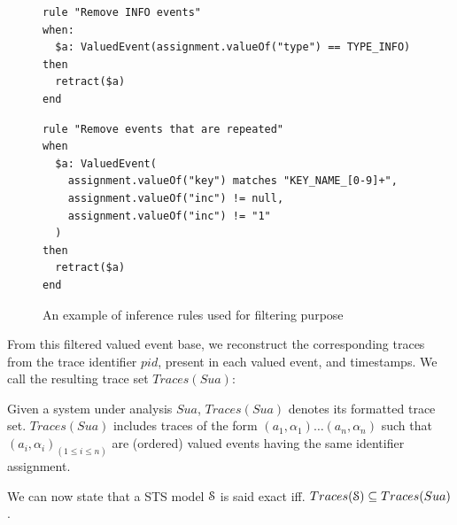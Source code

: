 \begin{figure}[ht]
\begin{framed}
\begin{BVerbatim}
rule "Remove INFO events"
when:
  $a: ValuedEvent(assignment.valueOf("type") == TYPE_INFO)
then
  retract($a)
end
\end{BVerbatim}
\end{framed}

\begin{framed}
\begin{BVerbatim}
rule "Remove events that are repeated"
when
  $a: ValuedEvent(
    assignment.valueOf("key") matches "KEY_NAME_[0-9]+",
    assignment.valueOf("inc") != null,
    assignment.valueOf("inc") != "1"
  )
then
  retract($a)
end
\end{BVerbatim}
\end{framed}

\caption{An example of inference rules used for filtering purpose}
\label{fig:removalrules}
\end{figure}

From this filtered valued event base, we reconstruct the
corresponding traces from the trace identifier $pid$, present in
each valued event, and timestamps. We call the resulting trace
set $Traces(Sua)$:

\begin{definition}
    Given a system under analysis $Sua$, $Traces(Sua)$ denotes
    its formatted trace set. $Traces(Sua)$ includes traces of the
    form $(a_1,\alpha_1) \dots (a_n,\alpha_n)$ such that
    $(a_i,\alpha_i)_{(1 \leq i \leq n)}$ are (ordered) valued
    events having the same identifier assignment.

	\label{def:structuredtrace}
\end{definition}

We can now state that a STS model $\EuScript{S}$ is said exact
iff. $Traces(\EuScript{S}) \subseteq Traces(Sua)$.

